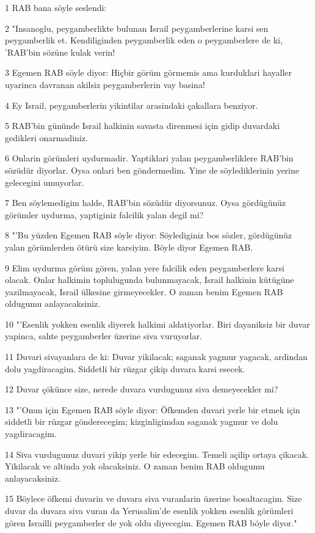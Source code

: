 \par 1 RAB bana söyle seslendi:
\par 2 "Insanoglu, peygamberlikte bulunan Israil peygamberlerine karsi sen peygamberlik et. Kendiliginden peygamberlik eden o peygamberlere de ki, 'RAB'bin sözüne kulak verin!
\par 3 Egemen RAB söyle diyor: Hiçbir görüm görmemis ama kurduklari hayaller uyarinca davranan akilsiz peygamberlerin vay basina!
\par 4 Ey Israil, peygamberlerin yikintilar arasindaki çakallara benziyor.
\par 5 RAB'bin gününde Israil halkinin savasta direnmesi için gidip duvardaki gedikleri onarmadiniz.
\par 6 Onlarin görümleri uydurmadir. Yaptiklari yalan peygamberliklere RAB'bin sözüdür diyorlar. Oysa onlari ben göndermedim. Yine de söylediklerinin yerine gelecegini umuyorlar.
\par 7 Ben söylemedigim halde, RAB'bin sözüdür diyorsunuz. Oysa gördügünüz görümler uydurma, yaptiginiz falcilik yalan degil mi?
\par 8 "'Bu yüzden Egemen RAB söyle diyor: Söylediginiz bos sözler, gördügünüz yalan görümlerden ötürü size karsiyim. Böyle diyor Egemen RAB.
\par 9 Elim uydurma görüm gören, yalan yere falcilik eden peygamberlere karsi olacak. Onlar halkimin toplulugunda bulunmayacak, Israil halkinin kütügüne yazilmayacak, Israil ülkesine girmeyecekler. O zaman benim Egemen RAB oldugumu anlayacaksiniz.
\par 10 "'Esenlik yokken esenlik diyerek halkimi aldatiyorlar. Biri dayaniksiz bir duvar yapinca, sahte peygamberler üzerine siva vuruyorlar.
\par 11 Duvari sivayanlara de ki: Duvar yikilacak; saganak yagmur yagacak, ardindan dolu yagdiracagim. Siddetli bir rüzgar çikip duvara karsi esecek.
\par 12 Duvar çökünce size, nerede duvara vurdugunuz siva demeyecekler mi?
\par 13 "'Onun için Egemen RAB söyle diyor: Öfkemden duvari yerle bir etmek için siddetli bir rüzgar gönderecegim; kizginligimdan saganak yagmur ve dolu yagdiracagim.
\par 14 Siva vurdugunuz duvari yikip yerle bir edecegim. Temeli açilip ortaya çikacak. Yikilacak ve altinda yok olacaksiniz. O zaman benim RAB oldugumu anlayacaksiniz.
\par 15 Böylece öfkemi duvarin ve duvara siva vuranlarin üzerine bosaltacagim. Size duvar da duvara siva vuran da Yerusalim'de esenlik yokken esenlik görümleri gören Israilli peygamberler de yok oldu diyecegim. Egemen RAB böyle diyor."
